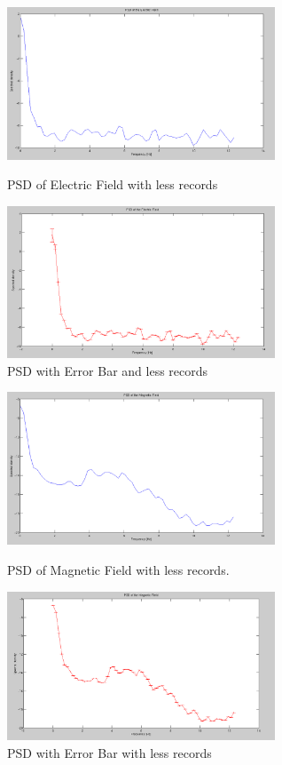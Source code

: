 \documentclass{article}
\begin{document}
\begin{figure}[ht]
\begin{minipage}[c]{0.5\linewidth}
\centering
\includegraphics[width=8cm]{Figures/PSD_electric_L.png}
\caption{PSD of Electric Field with less records}
\label{fig:PSD_electric}
\end{minipage}
\hspace{0.1cm}
\begin{minipage}[c]{0.5\linewidth}
\centering
\includegraphics[width=8cm]{Figures/PSD_electric_errorL.png}
\caption{PSD with Error Bar and less records}
\label{fig:PSD_electric_error}
\end{minipage}
\end{figure}

\begin{figure}[ht]
\begin{minipage}[c]{0.5\linewidth}
\centering
\includegraphics[width=8cm]{Figures/PSD_magnetic_L.png}
\caption{PSD of Magnetic Field with less records.}
\label{fig:PSD_magnetic}
\end{minipage}
\hspace{0.1cm}
\begin{minipage}[c]{0.5\linewidth}
\centering
\includegraphics[width=8cm]{Figures/PSD_magnetic_errorL.png}
\caption{PSD with Error Bar with less records}
\label{fig:PSD_magnetic_error}
\end{minipage}
\end{figure}
\end{document}
